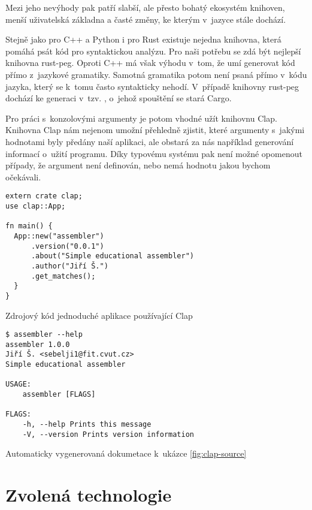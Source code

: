 Mezi jeho nevýhody pak patří slabší, ale přesto bohatý ekosystém knihoven, menší uživatelská základna\cite{so-survey-2018} a časté změny, ke kterým v~jazyce stále dochází.

Stejně jako pro C++ a Python i pro Rust existuje nejedna knihovna, která pomáhá psát kód pro syntaktickou analýzu. Pro naši potřebu se zdá být nejlepší knihovna rust-peg\cite{github-rust-peg}. Oproti C++ má však výhodu v~tom, že umí generovat kód přímo z~jazykové gramatiky. Samotná gramatika potom není psaná přímo v~kódu jazyka, který se k~tomu často syntakticky nehodí. V~případě knihovny rust-peg dochází ke generaci v~tzv. , o~jehož spouštění se stará Cargo.

Pro práci s~konzolovými argumenty je potom vhodné užít knihovnu Clap\cite{github-clap}. Knihovna Clap nám nejenom umožní přehledně zjistit, které argumenty s~jakými hodnotami byly předány naší aplikaci, ale obstará za nás například generování informací o~užití programu. Díky typovému systému pak není možné opomenout případy, že argument není definován, nebo nemá hodnotu jakou bychom očekávali.

\begin{listing}
\begin{verbatim}
extern crate clap;
use clap::App;
 
fn main() {
  App::new("assembler")
      .version("0.0.1")
      .about("Simple educational assembler")
      .author("Jiří Š.")
      .get_matches();
  }
}
\end{verbatim}
\caption{Zdrojový kód jednoduché aplikace používající Clap}
\label{fig:clap-source}
\end{listing}

\begin{listing}
\begin{verbatim}
$ assembler --help
assembler 1.0.0
Jiří Š. <sebelji1@fit.cvut.cz>
Simple educational assembler

USAGE:
    assembler [FLAGS]

FLAGS:
    -h, --help Prints this message
    -V, --version Prints version information
\end{verbatim}
\caption{Automaticky vygenerovaná dokumetace k~ukázce \ref{fig:clap-source}}
\label{fig:clap-output}
\end{listing}

\section{Zvolená technologie}

